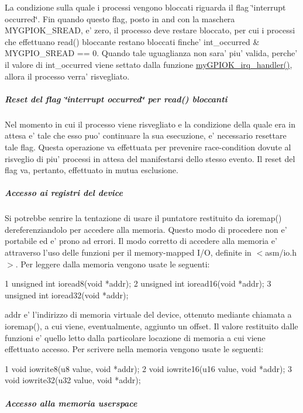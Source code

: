 La condizione sulla quale i processi vengono bloccati riguarda il flag \char`\"{}interrupt occurred\char`\"{}. Fin quando questo flag, posto in and con la maschera M\+Y\+G\+P\+I\+O\+K\+\_\+\+S\+R\+E\+A\+D, e' zero, il processo deve restare bloccato, per cui i processi che effettuano read() bloccante restano bloccati finche' int\+\_\+occurred \& M\+Y\+G\+P\+I\+O\+\_\+\+S\+R\+E\+A\+D == 0. Quando tale uguaglianza non sara' piu' valida, perche' il valore di int\+\_\+occurred viene settato dalla funzione \hyperlink{group___linux-_driver_ga2fc230a12a97aa63e43b2dc4aec73511}{my\+G\+P\+I\+O\+K\+\_\+irq\+\_\+handler()}, allora il processo verra' risvegliato.

\subparagraph*{Reset del flag \char`\"{}interrupt occurred\char`\"{} per read() bloccanti}

Nel momento in cui il processo viene risvegliato e la condizione della quale era in attesa e' tale che esso puo' continuare la sua esecuzione, e' necessario resettare tale flag. Questa operazione va effettuata per prevenire race-\/condition dovute al risveglio di piu' processi in attesa del manifestarsi dello stesso evento. Il reset del flag va, pertanto, effettuato in mutua esclusione.

\subparagraph*{Accesso ai registri del device}

Si potrebbe senrire la tentazione di usare il puntatore restituito da ioremap() dereferenziandolo per accedere alla memoria. Questo modo di procedere non e' portabile ed e' prono ad errori. Il modo corretto di accedere alla memoria e' attraverso l'uso delle funzioni per il memory-\/mapped I/\+O, definite in $<$asm/io.\+h$>$. Per leggere dalla memoria vengono usate le seguenti\+: 
\begin{DoxyCode}
1 unsigned int ioread8(void *addr);
2 unsigned int ioread16(void *addr);
3 unsigned int ioread32(void *addr);
\end{DoxyCode}
 addr e' l'indirizzo di memoria virtuale del device, ottenuto mediante chiamata a ioremap(), a cui viene, eventualmente, aggiunto un offset. Il valore restituito dalle funzioni e' quello letto dalla particolare locazione di memoria a cui viene effettuato accesso. Per scrivere nella memoria vengono usate le seguenti\+: 
\begin{DoxyCode}
1 void iowrite8(u8 value, void *addr);
2 void iowrite16(u16 value, void *addr);
3 void iowrite32(u32 value, void *addr);
\end{DoxyCode}


\subparagraph*{Accesso alla memoria userspace}

